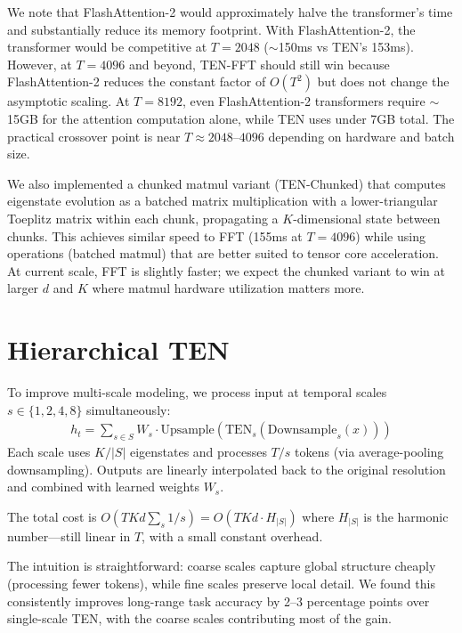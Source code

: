 \documentclass{article}
\begin{document}
We note that FlashAttention-2 would approximately halve the transformer's time and substantially reduce its memory footprint. With FlashAttention-2, the transformer would be competitive at $T = 2048$ ($\sim$150ms vs TEN's 153ms). However, at $T = 4096$ and beyond, TEN-FFT should still win because FlashAttention-2 reduces the constant factor of $O(T^2)$ but does not change the asymptotic scaling. At $T = 8192$, even FlashAttention-2 transformers require $\sim$15GB for the attention computation alone, while TEN uses under 7GB total. The practical crossover point is near $T \approx 2048\text{--}4096$ depending on hardware and batch size.

We also implemented a chunked matmul variant (TEN-Chunked) that computes eigenstate evolution as a batched matrix multiplication with a lower-triangular Toeplitz matrix within each chunk, propagating a $K$-dimensional state between chunks. This achieves similar speed to FFT (155ms at $T = 4096$) while using operations (batched matmul) that are better suited to tensor core acceleration. At current scale, FFT is slightly faster; we expect the chunked variant to win at larger $d$ and $K$ where matmul hardware utilization matters more.

\label{sec:efficiency}


\section{Hierarchical TEN}
\label{sec:hten}

To improve multi-scale modeling, we process input at temporal scales $s \in \{1, 2, 4, 8\}$ simultaneously:
\begin{align}
h_t = \sum_{s \in S} W_s \cdot \text{Upsample}\left(\text{TEN}_s\left(\text{Downsample}_s(x)\right)\right)
\end{align}
Each scale uses $K/|S|$ eigenstates and processes $T/s$ tokens (via average-pooling downsampling). Outputs are linearly interpolated back to the original resolution and combined with learned weights $W_s$.

The total cost is $O\left(TKd \sum_s 1/s\right) = O(TKd \cdot H_{|S|})$ where $H_{|S|}$ is the harmonic number---still linear in $T$, with a small constant overhead.

The intuition is straightforward: coarse scales capture global structure cheaply (processing fewer tokens), while fine scales preserve local detail. We found this consistently improves long-range task accuracy by 2--3 percentage points over single-scale TEN, with the coarse scales contributing most of the gain.
\end{document}
